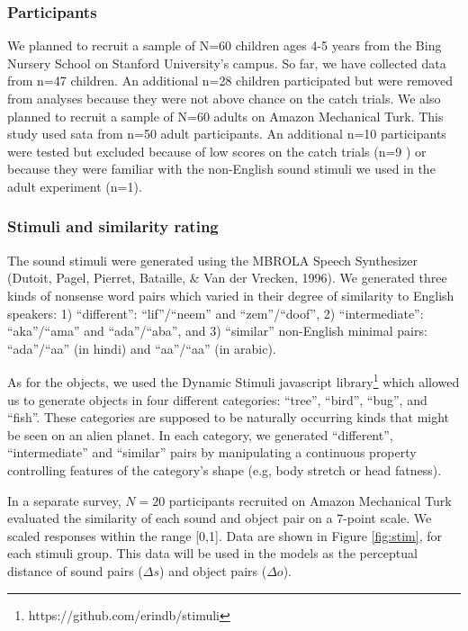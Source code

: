 \documentclass[10pt, letterpaper]{article}
\begin{document}
\subsubsection{Participants}\label{participants}

We planned to recruit a sample of N=60 children ages 4-5 years from the
Bing Nursery School on Stanford University's campus. So far, we have
collected data from n=47 children. An additional n=28 children
participated but were removed from analyses because they were not above
chance on the catch trials. We also planned to recruit a sample of N=60
adults on Amazon Mechanical Turk. This study used sata from n=50 adult
participants. An additional n=10 participants were tested but excluded
because of low scores on the catch trials (n=9 ) or because they were
familiar with the non-English sound stimuli we used in the adult
experiment (n=1).

\subsubsection{Stimuli and similarity
rating}\label{stimuli-and-similarity-rating}

The sound stimuli were generated using the MBROLA Speech Synthesizer
(Dutoit, Pagel, Pierret, Bataille, \& Van der Vrecken, 1996). We
generated three kinds of nonsense word pairs which varied in their
degree of similarity to English speakers: 1) ``different'':
``lif''/``neem'' and ``zem''/``doof'', 2) ``intermediate'':
``aka''/``ama'' and ``ada''/``aba'', and 3) ``similar'' non-English
minimal pairs: ``ada''/``aa'' (in hindi) and
``aa''/``a\textipa{\textcrh}a'' (in arabic).

As for the objects, we used the Dynamic Stimuli javascript
library\footnote{https://github.com/erindb/stimuli} which allowed us to
generate objects in four different categories: ``tree'', ``bird'',
``bug'', and ``fish''. These categories are supposed to be naturally
occurring kinds that might be seen on an alien planet. In each category,
we generated ``different'', ``intermediate'' and ``similar'' pairs by
manipulating a continuous property controlling features of the
category's shape (e.g, body stretch or head fatness).

In a separate survey, \(N=20\) participants recruited on Amazon
Mechanical Turk evaluated the similarity of each sound and object pair
on a 7-point scale. We scaled responses within the range {[}0,1{]}. Data
are shown in Figure \ref{fig:stim}, for each stimuli group. This data
will be used in the models as the perceptual distance of sound pairs
(\(\Delta s\)) and object pairs (\(\Delta o\)).
\end{document}
